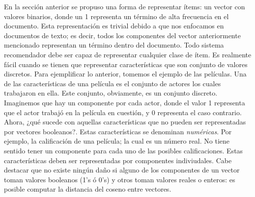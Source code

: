 				En la sección anterior se propuso una forma de representar ítems: un vector con valores binarios, donde un 1 representa un término de alta frecuencia en el documento. Esta representación es trivial debido a que nos enfocamos en documentos de texto; es decir, todos los componentes del vector anteriormente mencionado representan un término dentro del documento. Todo sistema recomendador debe ser capaz de representar cualquier clase de ítem. Es realmente fácil cuando se tienen que representar características que son conjunto de valores discretos. Para ejemplificar lo anterior, tomemos el ejemplo de las películas. Una de las características de una película es el conjunto de actores los cuales trabajaron en ella. Este conjunto, obviamente, es un conjunto discreto. Imaginemos que hay un componente por cada actor, donde el valor 1 representa que el actor trabajó en la película en cuestión, y 0 representa el caso contrario. \\
				Ahora, ¿qué sucede con aquellas características que no pueden ser representadas por vectores booleanos?. Estas características se denominan \textit{numéricas}. Por ejemplo, la calificación de una película; la cual es un número real. No tiene sentido tener un componente para cada uno de las posibles calificaciones. Estas características deben ser representadas por componentes indiviudales. Cabe destacar que no existe ningún daño si alguno de los componentes de un vector toman valores booleanos (1's ó 0's) y otros toman valores reales o enteros: es posible computar la distancia del coseno entre vectores.
